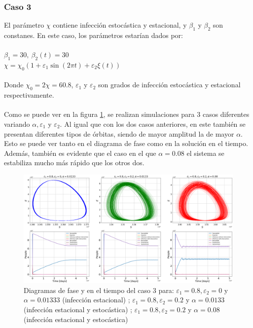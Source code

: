 \documentclass[conference]{IEEEtran}
\begin{document}
\subsubsection{Caso 3}

El parámetro $\chi$ contiene infección estocástica y estacional, y $\beta_1$ y $\beta_2$ son constanes.
En este caso, los parámetros estarían dados por:
\\\\
$\beta_1 = 30, \ \beta_2(t) = 30$
\\
$\chi = \chi_0(1 + \varepsilon_1 \sin(2 \pi t) + \varepsilon_2 \xi(t))$
\\\\
Donde $\chi_0 = 2\chi = 60.8$, $\varepsilon_1$ y $\varepsilon_2$ son grados de infección estocástica y estacional respectivamente.
\\\\
Como se puede ver en la figura \ref{case_3}, se realizan simulaciones para 3 casos diferentes variando $\alpha, 
\varepsilon_1$ y $\varepsilon_2$. Al igual que con los dos casos anteriores, en este también se presentan
diferentes tipos de órbitas, siendo de mayor amplitud la de mayor $\alpha$. Esto se puede ver tanto en el
diagrama de fase como en la solución en el tiempo. Además, también es evidente que el caso en el que $\alpha = 0.08$
el sistema se estabiliza mucho más rápido que los otros dos.
\begin{figure}[h]
    \centering
    \includegraphics[width=18cm]{../Figures/case_3.png}
    \caption{Diagramas de fase y en el tiempo del caso 3 para: $\varepsilon_1 = 0.8, \varepsilon_2 = 0$
    y $\alpha = 0.01333$ (infección estacional) ; $\varepsilon_1 = 0.8, \varepsilon_2 = 0.2$
    y $\alpha = 0.0133$ (infección estacional y estocástica) ; $\varepsilon_1 = 0.8, \varepsilon_2 = 0.2$
    y $\alpha = 0.08$ (infección estacional y estocástica)}
    \label{case_3}
\end{figure}
\end{document}
